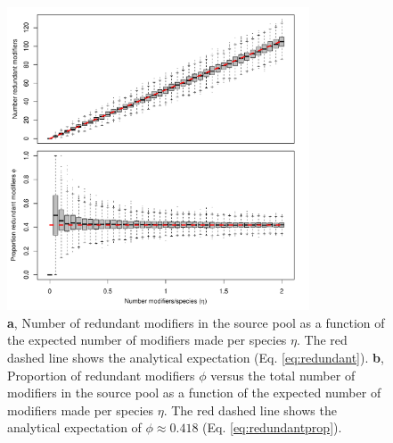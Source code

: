 \documentclass[twocolumn,preprintnumbers,amsmath,amssymb,superscriptaddress,linenumbers]{revtex4-1}
\begin{document}
\begin{figure}[h!]
\centering
\includegraphics[width=0.8\textwidth]{fig_redundancy.pdf}
\caption{
\textbf{a}, Number of redundant modifiers in the source pool as a function of the expected number of modifiers made per species $\eta$.
The red dashed line shows the analytical expectation (Eq. \ref{eq:redundant}).
\textbf{b}, Proportion of redundant modifiers $\phi$ versus the total number of modifiers in the source pool as a function of the expected number of modifiers made per species $\eta$.
The red dashed line shows the analytical expectation of $\phi \approx 0.418$ (Eq. \ref{eq:redundantprop}).
}
\label{fig:redundancy}
\end{figure}
\end{document}
